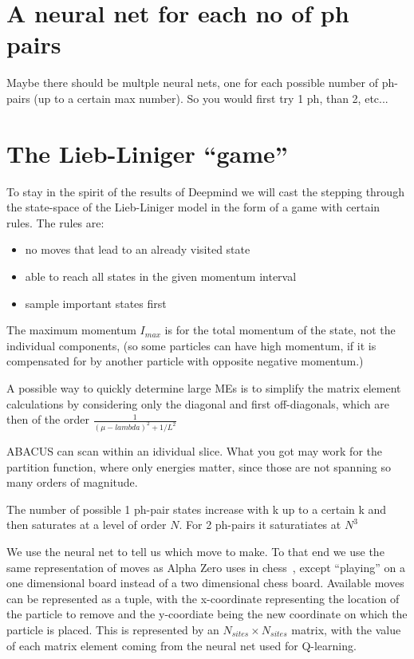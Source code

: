 \documentclass[11pt, a4paper]{report} %
\begin{document}
\section{A neural net for each no of ph pairs}
Maybe there should be multple neural nets, one for each possible number of ph-pairs (up to a certain max number).
So you would first try 1 ph, than 2, etc...

\section{The Lieb-Liniger ``game''}

To stay in the spirit of the results of Deepmind we will cast the stepping through the state-space of the Lieb-Liniger model in the form of a game with certain rules.
The rules are:
\begin{itemize}
  \item no moves that lead to an already visited state
  \item able to reach all states in the given momentum interval
  \item sample important states first
\end{itemize}

The maximum momentum $I_{max}$ is for the total momentum of the state, not the individual components, (so some particles can have high momentum, if it is compensated for by another particle with opposite negative momentum.)

A possible way to quickly determine large MEs is to simplify the matrix element calculations by considering only the diagonal and first off-diagonals, which are then of the order $\frac{1}{(\mu-lambda)^2 + 1/L^2}$

ABACUS can scan within an idividual slice.
What you got may work for the partition function, where only energies matter, since those are not spanning so many orders of magnitude.

The number of possible 1 ph-pair states increase with k up to a certain k and then saturates at a level of order $N$.
For 2 ph-pairs it saturatiates at $N^3$

We use the neural net to tell us which move to make.
To that end we use the same representation of moves as Alpha Zero uses in chess~\cite{Silver2017}, except ``playing'' on a one dimensional board instead of a two dimensional chess board.
Available moves can be represented as a tuple, with the x-coordinate representing the location of the particle to remove and the y-coordiate being the new coordinate on which the particle is placed.
This is represented by an $N_{sites} \times N_{sites}$ matrix, with the value of each matrix element coming from the neural net used for Q-learning.
\end{document}
